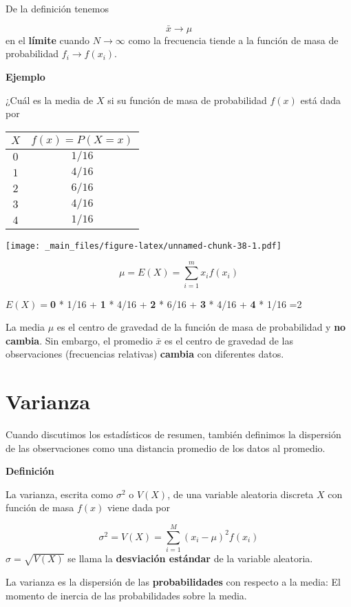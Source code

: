 \documentclass[
]{book}
\begin{document}
De la definición tenemos

\[\bar{x} \rightarrow \mu\] en el \textbf{límite} cuando
\(N \rightarrow \infty\) como la frecuencia tiende a la función de masa de probabilidad \(f_i \rightarrow f(x_i)\).

\textbf{Ejemplo}

¿Cuál es la media de \(X\) si su función de masa de probabilidad \(f(x)\) está dada por

\begin{longtable}[]{@{}cc@{}}
\toprule
\(X\) & \(f(x)=P(X=x)\) \\
\midrule
\endhead
\(0\) & \(1/16\) \\
\(1\) & \(4/16\) \\
\(2\) & \(6/16\) \\
\(3\) & \(4/16\) \\
\(4\) & \(1/16\) \\
\bottomrule
\end{longtable}

\texttt{[image: \_main\_files/figure-latex/unnamed-chunk-38-1.pdf]}

\[ \mu =E(X)=\sum_{i=1}^m x_i f(x_i) \]

\(E(X)=\)\textbf{0} * 1/16 + \textbf{1} * 4/16 + \textbf{2} * 6/16 + \textbf{3} * 4/16 + \textbf{4} * 1/16 =2

La media \(\mu\) es el centro de gravedad de la función de masa de probabilidad y \textbf{no cambia}. Sin embargo, el promedio \(\bar{x}\) es el centro de gravedad de las observaciones (frecuencias relativas) \textbf{cambia} con diferentes datos.

\hypertarget{varianza}{%
\section{Varianza}\label{varianza}}

Cuando discutimos los estadísticos de resumen, también definimos la dispersión de las observaciones como una distancia promedio de los datos al promedio.

\textbf{Definición}

La varianza, escrita como \(\sigma^2\) o \(V(X)\), de una variable aleatoria discreta \(X\) con función de masa \(f(x)\) viene dada por

\[\sigma^2 = V(X)= \sum_{i=1}^M (x_i-\mu)^2 f(x_i)\]
\(\sigma=\sqrt{V(X)}\) se llama la \textbf{desviación estándar} de la variable aleatoria.

La varianza es la dispersión de las \textbf{probabilidades} con respecto a la media: El momento de inercia de las probabilidades sobre la media.
\end{document}
